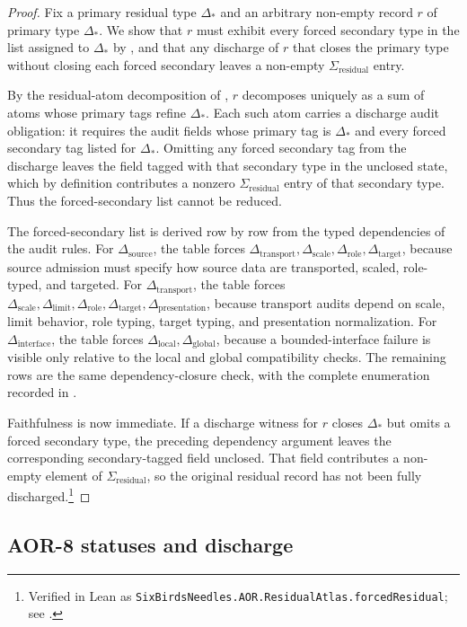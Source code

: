 \documentclass[11pt]{article}
\newcommand{\Sigres}{\Sigma_{\mathrm{residual}}}
\newcommand{\Dtransport}{\Delta_{\mathrm{transport}}}
\newcommand{\Dinterface}{\Delta_{\mathrm{interface}}}
\newcommand{\Dlocal}{\Delta_{\mathrm{local}}}
\newcommand{\Dglobal}{\Delta_{\mathrm{global}}}
\newcommand{\Dpresentation}{\Delta_{\mathrm{presentation}}}
\newcommand{\Dsource}{\Delta_{\mathrm{source}}}
\newcommand{\Dscale}{\Delta_{\mathrm{scale}}}
\newcommand{\Dlimit}{\Delta_{\mathrm{limit}}}
\newcommand{\Drole}{\Delta_{\mathrm{role}}}
\newcommand{\Dtarget}{\Delta_{\mathrm{target}}}
\theoremstyle{definition}
\begin{document}
\begin{proof}
Fix a primary residual type \(\Delta_*\) and an arbitrary non-empty record
\(r\) of primary type \(\Delta_*\).  We show that \(r\) must exhibit every
forced secondary type in the list assigned to \(\Delta_*\) by
, and that any discharge of \(r\) that
closes the primary type without closing each forced secondary leaves a
non-empty \(\Sigres\) entry.

By the residual-atom decomposition of ,
\(r\) decomposes uniquely as a sum of atoms whose primary tags refine
\(\Delta_*\).  Each such atom carries a discharge audit obligation: it
requires the audit fields whose primary tag is \(\Delta_*\) and every forced
secondary tag listed for \(\Delta_*\).  Omitting any forced secondary tag from
the discharge leaves the field tagged with that secondary type in the
unclosed state, which by definition contributes a nonzero \(\Sigres\) entry
of that secondary type.  Thus the forced-secondary list cannot be reduced.

The forced-secondary list is derived row by row from the typed dependencies
of the audit rules.  For \(\Dsource\), the table forces
\(\Dtransport,\Dscale,\Drole,\Dtarget\), because source admission must specify
how source data are transported, scaled, role-typed, and targeted.  For
\(\Dtransport\), the table forces
\(\Dscale,\Dlimit,\Drole,\Dtarget,\Dpresentation\), because transport audits
depend on scale, limit behavior, role typing, target typing, and presentation
normalization.  For \(\Dinterface\), the table forces
\(\Dlocal,\Dglobal\), because a bounded-interface failure is visible only
relative to the local and global compatibility checks.  The remaining rows
are the same dependency-closure check, with the complete enumeration recorded
in .

Faithfulness is now immediate.  If a discharge witness for \(r\) closes
\(\Delta_*\) but omits a forced secondary type, the preceding dependency
argument leaves the corresponding secondary-tagged field unclosed.  That
field contributes a non-empty element of \(\Sigres\), so the original
residual record has not been fully discharged.\footnote{Verified in Lean as \texttt{SixBirdsNeedles.AOR.ResidualAtlas.forcedResidual}; see .}
\end{proof}

\subsection{AOR-8 statuses and discharge}\label{sec:aor-primary-results-statuses}
\end{document}
